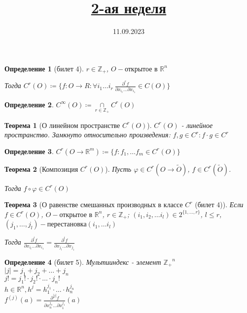 \documentclass[11pt,a4paper,oneside]{scrartcl}
\title{\href{https://www.youtube.com/live/CfB6Jk_3U4o?si=kOlWnc-YSZmP9kN7}{2-ая неделя}}
\date{11.09.2023}
\newtheorem{definition}{Определение}
\newtheorem{theorem}{Теорема}
\begin{document}
\pagestyle{empty}

\maketitle

\begin{definition}[билет 4]
    $r \in \mathbb{Z_+}$, $O - \text{открытое в } \mathbb{R}^n$

    Тогда $C^r(O) \coloneqq \{ f \colon O \rightarrow R :
    \forall i_1 \dots i_r \ \frac{\partial^r f}{\partial x_{i_r} \dots \partial x_{i_1}} \in C(O) \}$
\end{definition}

\begin{definition}
    $C^{\infty} (O) \coloneqq \underset{r \in \mathbb{Z_+}}{\cap} C^r (O)$
\end{definition}

\begin{theorem}[О линейном пространстве $C^r (O)$]
    $C^r (O)$ - линейное пространство.
    Замкнуто относительно произведения: $f, g \in C^r : f \cdot g \in C^r$
\end{theorem}

\begin{definition}
    $C^r (O \rightarrow \mathbb{R}^m) \coloneqq \{f : f_1, \dots f_m \in C^r(O)\} $
\end{definition}

\begin{theorem}[Композиция $C^r (O)$]
    Пусть $\varphi \in C^r (O \rightarrow \tilde{O})$, $f \in C^r(\tilde{O})$.

    Тогда $f \circ \varphi \in C^r (O)$
\end{theorem}

\begin{theorem}[О равенстве смешанных производных в классе $C^r$ (билет 4)]
    Если $f \in C^r (O)$, $O - \text{открытое в } \mathbb{R}^n$, $r \in \mathbb{Z_+}$;
    $(i_1, i_2, \dots i_l) \in 2^{ \{1, \dots, r\} }$, $l \leq r$,
    $(j_1, \dots, j_l) - \text{перестановка} (i_1, \dots i_l)$

    Тогда $\frac{\partial^l f}{\partial x_{i_l} \dots \partial x_{i_1}}
        = \frac{\partial^l f}{\partial x_{j_l} \dots \partial x_{j_1}}$
\end{theorem}

\begin{definition}[билет 5]
    Мультииндекс - элемент $\mathbb{Z_+}^n$ \\
    $|j| = j_1 + j_2 + \dots + j_n$ \\
    $j! = j_1! \cdot j_2! \cdot \dots \cdot j_n!$ \\
    $h \in \mathbb{R}^n, h^j = h_1^{j_1} \cdot \dots \cdot h_n^{j_n}$ \\
    $f^{(j)} (a) = \frac{\partial^{|j|} f}{\partial x_n^{j_n} \dots \partial x_1^{j_1}} (a)$
\end{definition}
\end{document}
